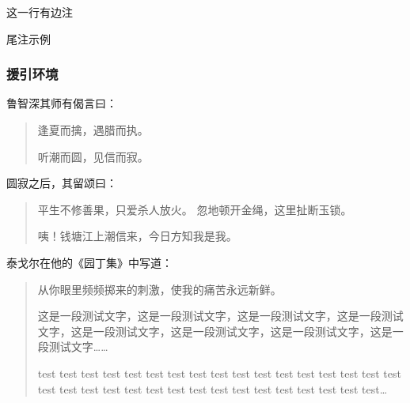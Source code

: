             这一行有边注


            尾注示例
            
        \subsubsection{援引环境}
            鲁智深其师有偈言曰：
            \begin{quote}
                逢夏而擒，遇腊而执。

                听潮而圆，见信而寂。
            \end{quote}

            圆寂之后，其留颂曰：
            \begin{quotation}
                平生不修善果，只爱杀人放火。
                忽地顿开金绳，这里扯断玉锁。

                咦！钱塘江上潮信来，今日方知我是我。
            \end{quotation}

            泰戈尔在他的《园丁集》中写道：
            \begin{verse}
                从你眼里频频掷来的刺激，使我的痛苦永远新鲜。

                这是一段测试文字，这是一段测试文字，这是一段测试文字，这是一段测试文字，这是一段测试文字，这是一段测试文字，这是一段测试文字，这是一段测试文字……

                test test test test test test test test test test test test test test test test test test test test test test test test test test test test test test test test test\ldots
            \end{verse}

